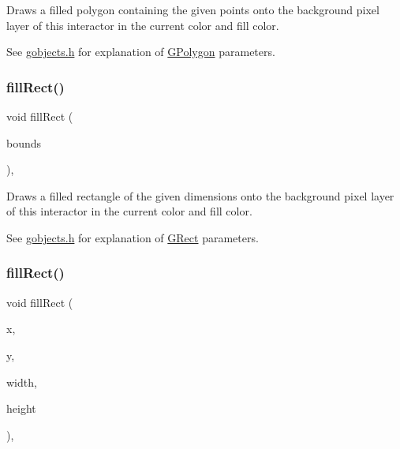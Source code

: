 Draws a filled polygon containing the given points onto the background pixel layer of this interactor in the current color and fill color. 

See \mbox{\hyperlink{gobjects_8h_source}{gobjects.\+h}} for explanation of \mbox{\hyperlink{classsgl_1_1GPolygon}{G\+Polygon}} parameters. \mbox{\label{classsgl_1_1GDrawingSurface_ae6582295003bf2488836b1993dadbad7}} 
\subsubsection{\texorpdfstring{fill\+Rect()}{fillRect()}\hspace{0.1cm}{\footnotesize\ttfamily [1/2]}}
{\footnotesize\ttfamily void fill\+Rect (\begin{DoxyParamCaption}\item[{const \mbox{\hyperlink{structsgl_1_1GRectangle}{G\+Rectangle}} \&}]{bounds }\end{DoxyParamCaption})\hspace{0.3cm}{\ttfamily [virtual]}, {\ttfamily [inherited]}}



Draws a filled rectangle of the given dimensions onto the background pixel layer of this interactor in the current color and fill color. 

See \mbox{\hyperlink{gobjects_8h_source}{gobjects.\+h}} for explanation of \mbox{\hyperlink{classsgl_1_1GRect}{G\+Rect}} parameters. \mbox{\label{classsgl_1_1GDrawingSurface_aac3ae7d3aee950de78eca0e108352254}} 
\subsubsection{\texorpdfstring{fill\+Rect()}{fillRect()}\hspace{0.1cm}{\footnotesize\ttfamily [2/2]}}
{\footnotesize\ttfamily void fill\+Rect (\begin{DoxyParamCaption}\item[{double}]{x,  }\item[{double}]{y,  }\item[{double}]{width,  }\item[{double}]{height }\end{DoxyParamCaption})\hspace{0.3cm}{\ttfamily [virtual]}, {\ttfamily [inherited]}}



